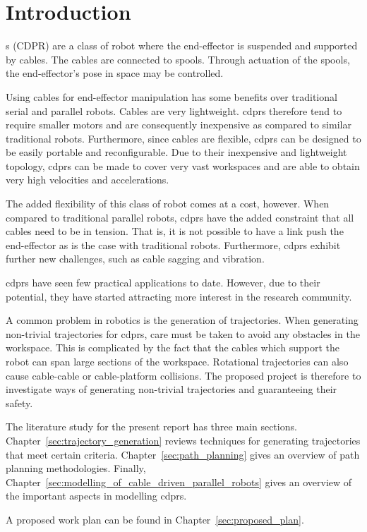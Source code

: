 \chapter{Introduction}%
\label{chap:introduction}

	s (CDPR)  are a class of
	robot where the end-effector is suspended and supported by cables. The
	cables are connected to spools. Through actuation of the spools, the
	end-effector's pose in space may be controlled.

	Using cables for end-effector manipulation has some benefits over
	traditional serial and parallel robots. Cables are very lightweight.
	\glspl{cdpr} therefore tend to require smaller motors and are consequently
	inexpensive as compared to similar traditional robots. Furthermore, since
	cables are flexible, \glspl{cdpr} can be designed to be easily portable and
	reconfigurable. Due to their inexpensive and lightweight topology,
	\glspl{cdpr} can be made to cover very vast workspaces and are able to
	obtain very high velocities and accelerations.

	The added flexibility of this class of robot comes at a cost, however. When
	compared to traditional parallel robots, \glspl{cdpr} have the added
	constraint that all cables need to be in tension. That is, it is not
	possible to have a link push the end-effector as is the case with
	traditional robots. Furthermore, \glspl{cdpr} exhibit further new
	challenges, such as cable sagging and vibration.

	\glspl{cdpr} have seen few practical applications to date. However, due to
	their potential, they have started attracting more interest in the research
	community.

	A common problem in robotics is the generation of trajectories.
	When generating non-trivial trajectories for \glspl{cdpr}, care must be
	taken to avoid any obstacles in the workspace. This is complicated by the
	fact that the cables which support the robot can span large sections of the
	workspace.  Rotational trajectories can also cause cable-cable or
	cable-platform collisions. The proposed project is therefore to investigate
	ways of generating non-trivial trajectories and guaranteeing their safety.


	The literature study for the present report has three main sections.
	Chapter~\ref{sec:trajectory_generation} reviews techniques for generating
	trajectories that meet certain criteria. Chapter~\ref{sec:path_planning}
	gives an overview of path planning methodologies. Finally,
	Chapter~\ref{sec:modelling_of_cable_driven_parallel_robots} gives an
	overview of the important aspects in modelling \glspl{cdpr}.

	A proposed work plan can be found in Chapter~\ref{sec:proposed_plan}.
